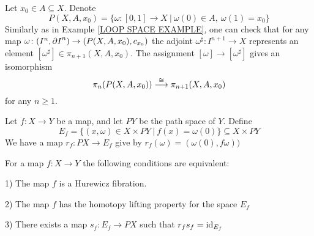 \begin{example}
\label{REL HOMOT GPS PATH SPACE EXAMPLE}
Let $x_{0}\in A \subseteq X$. Denote 
\[
P(X, A, x_{0}) = \{\omega\colon [0, 1]\to X \ | \ \omega(0)\in A, \ \omega(1) = x_{0}\}
\]
Similarly as in Example \ref{LOOP SPACE EXAMPLE}, one can check 
that for any map $\omega \colon (I^{n}, {\partial I}^{n}) \to (P(X, A, x_{0}), c_{x_{0}})$
the adjoint $\omega^{\sharp}\colon I^{n+1} \to X$ represents an element 
$[\omega^{\sharp}]\in \pi_{n+1}(X, A, x_{0})$. The assignment 
$[\omega] \to [\omega^{\sharp}]$ gives an isomorphism
\[
\pi_{n}(P(X, A, x_{0})) \overset{\cong}{\longrightarrow} \pi_{n+1}(X, A, x_{0})
\]
for any $n\geq 1$. 
\end{example}


Let $f\colon X \to Y$ be a map, and let $PY$ be the path space of $Y$. 
Define
\[
E_{f} = \{(x, \omega) \in  X \times PY \ |\ f(x) = \omega(0)\} \subseteq X\times PY
\]
We have a map $r_{f}\colon PX \to E_{f}$ give  by $r_{f}(\omega) = (\omega(0), f\omega))$


\begin{proposition}
\label{FIBRATION EQUIV CONDITIONS PROP}
For a map $f\colon X\to Y$ the following conditions are equivalent:
\benu
\item[1)] The map $f$ is a Hurewicz fibration.
\item[2)] The map $f$ has the homotopy lifting property for the space $E_{f}$
\item[3)] There exists a map $s_{f}\colon E_{f} \to PX$ such that $r_{f}s_{f} = \mathrm{id}_{E_{f}}$
\eenu
\end{proposition}

